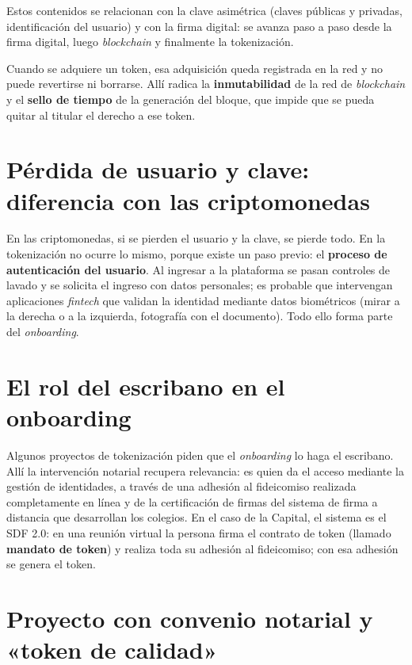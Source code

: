 \documentclass[12pt,oneside]{book}
\begin{document}
Estos contenidos se relacionan con la clave asimétrica (claves públicas y privadas, identificación del usuario) y con la firma digital: se avanza paso a paso desde la firma digital, luego \textit{blockchain} y finalmente la tokenización.

Cuando se adquiere un token, esa adquisición queda registrada en la red y no puede revertirse ni borrarse. Allí radica la \textbf{inmutabilidad} de la red de \textit{blockchain} y el \textbf{sello de tiempo} de la generación del bloque, que impide que se pueda quitar al titular el derecho a ese token.

\section{Pérdida de usuario y clave: diferencia con las criptomonedas}

En las criptomonedas, si se pierden el usuario y la clave, se pierde todo. En la tokenización no ocurre lo mismo, porque existe un paso previo: el \textbf{proceso de autenticación del usuario}. Al ingresar a la plataforma se pasan controles de lavado y se solicita el ingreso con datos personales; es probable que intervengan aplicaciones \textit{fintech} que validan la identidad mediante datos biométricos (mirar a la derecha o a la izquierda, fotografía con el documento). Todo ello forma parte del \textit{onboarding}.

\section{El rol del escribano en el onboarding}

Algunos proyectos de tokenización piden que el \textit{onboarding} lo haga el escribano. Allí la intervención notarial recupera relevancia: es quien da el acceso mediante la gestión de identidades, a través de una adhesión al fideicomiso realizada completamente en línea y de la certificación de firmas del sistema de firma a distancia que desarrollan los colegios. En el caso de la Capital, el sistema es el SDF 2.0: en una reunión virtual la persona firma el contrato de token (llamado \textbf{mandato de token}) y realiza toda su adhesión al fideicomiso; con esa adhesión se genera el token.

\section{Proyecto con convenio notarial y «token de calidad»}
\end{document}
